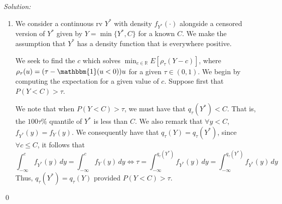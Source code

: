 \documentclass[12pt]{article}
\newenvironment{problem}[2][Problem]{\begin{trivlist}
\item[\hskip \labelsep {\bfseries #1}\hskip \labelsep {\bfseries #2.}]}{\end{trivlist}}
\newenvironment{sol}
    {\emph{Solution:}
    }
    {
    \qed
    }
\begin{document}
\begin{problem}{1}
\end{problem}
\begin{sol}
    \begin{enumerate}[label=\alph*) ]
        \item We consider a continuous rv $Y^*$ with density $f_{Y^*}(\cdot)$ alongside a censored version of $Y^*$ given by $Y = \min\{Y^*, C\}$ for a known $C$. We make the assumption that $Y^*$ has a density function that is everywhere positive.
        
        We seek to find the $c$ which solves $\min_{c \in \mathbb{R}} E[\rho_{\tau}(Y - c)]$, where $\rho_{\tau}(u) = (\tau - \mathbbm{1}(u < 0))u$ for a given $\tau \in (0,1)$. We begin by computing the expectation for a given value of $c$. Suppose first that $P(Y < C) > \tau$.

        We note that when $P(Y < C) > \tau$, we must have that $q_{\tau}(Y^*) < C$. That is, the $100\tau\%$ quantile of $Y^*$ is less than $C$. We also remark that $\forall y < C$, $f_{Y^*}(y) = f_{Y}(y)$. We consequently have that $q_{\tau}(Y) = q_{\tau}(Y^*)$, since $\forall c \leq C$, it follows that
        \[\int_{-\infty}^{c} f_{Y^*}(y) \, dy = \int_{-\infty}^{c} f_Y(y) \, dy \iff \tau = \int_{-\infty}^{q_{\tau}(Y^*)} f_{Y^*}(y) \, dy = \int_{-\infty}^{q_{\tau}(Y^*)} f_{Y^*}(y) \, dy\]
        Thus, $q_{\tau}(Y^*) = q_{\tau}(Y)$ provided $P(Y < C) > \tau$. 


\end{enumerate}
\end{sol}
\end{document}

